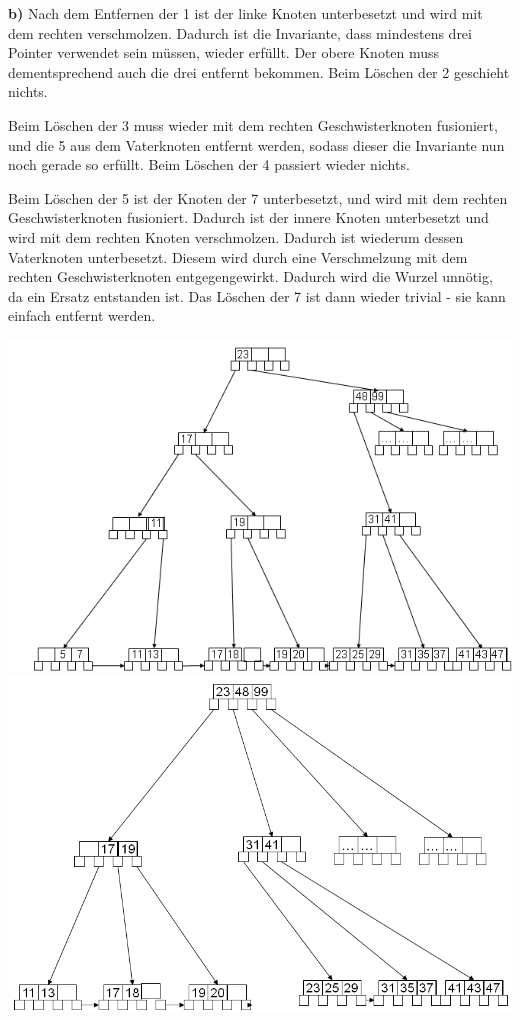 \documentclass[12pt]{article}
\begin{document}
\textbf{b)} Nach dem Entfernen der 1 ist der linke Knoten unterbesetzt und wird
mit dem rechten verschmolzen. Dadurch ist die Invariante, dass mindestens drei
Pointer verwendet sein müssen, wieder erfüllt. Der obere Knoten muss
dementsprechend auch die drei entfernt bekommen. Beim Löschen der 2 geschieht
nichts.

Beim Löschen der 3 muss wieder mit dem rechten Geschwisterknoten
fusioniert, und die 5 aus dem Vaterknoten entfernt werden, sodass dieser die
Invariante nun noch gerade so erfüllt. Beim Löschen der 4 passiert wieder
nichts.

Beim Löschen der 5 ist der Knoten der 7 unterbesetzt, und wird mit dem
rechten Geschwisterknoten fusioniert. Dadurch ist der innere Knoten unterbesetzt
und wird mit dem rechten Knoten verschmolzen. Dadurch ist wiederum dessen
Vaterknoten unterbesetzt. Diesem wird durch eine Verschmelzung mit dem rechten
Geschwisterknoten entgegengewirkt. Dadurch wird die Wurzel unnötig, da ein
Ersatz entstanden ist. Das Löschen der 7 ist dann wieder trivial - sie kann
einfach entfernt werden.
\begin{center}
    \includegraphics{delete_4.PNG}
    \includegraphics{delete_7.PNG}
\end{center}
\end{document}
